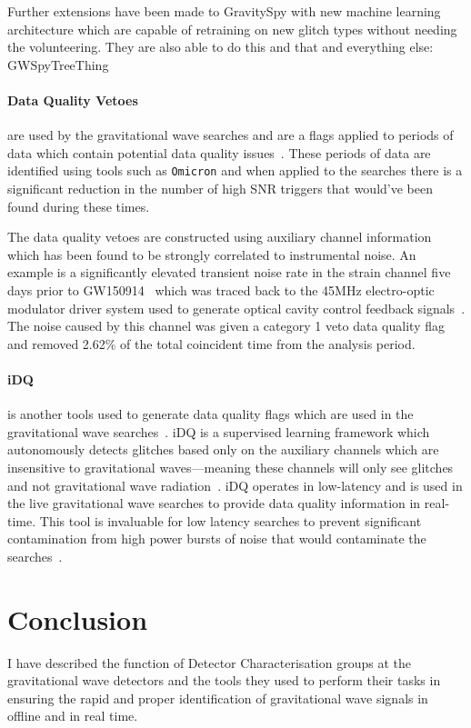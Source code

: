 Further extensions have been made to GravitySpy with new machine learning architecture which are capable of retraining on new glitch types without needing the volunteering. They are also able to do this and that and everything else: GWSpyTreeThing~\cite{}


\paragraph{Data Quality Vetoes}

are used by the gravitational wave searches and are a flags applied to periods of data which contain potential data quality issues~\cite{}. These periods of data are identified using tools such as \verb|Omicron| and when applied to the searches there is a significant reduction in the number of high SNR triggers that would've been found during these times.

The data quality vetoes are constructed using auxiliary channel information which has been found to be strongly correlated to instrumental noise. An example is a significantly elevated transient noise rate in the strain channel five days prior to GW150914~\cite{} which was traced back to the 45MHz electro-optic modulator driver system used to generate optical cavity control feedback signals~\cite{aligo}. The noise caused by this channel was given a category 1 veto data quality flag and removed 2.62\% of the total coincident time from the analysis period.

\paragraph{iDQ}

is another tools used to generate data quality flags which are used in the gravitational wave searches~\cite{}. iDQ is a supervised learning framework which autonomously detects glitches based only on the auxiliary channels which are insensitive to gravitational waves---meaning these channels will only see glitches and not gravitational wave radiation~\cite{}. iDQ operates in low-latency and is used in the live gravitational wave searches to provide data quality information in real-time. This tool is invaluable for low latency searches to prevent significant contamination from high power bursts of noise that would contaminate the searches~\cite{}.

\section{Conclusion}

I have described the function of Detector Characterisation groups at the gravitational wave detectors and the tools they used to perform their tasks in ensuring the rapid and proper identification of gravitational wave signals in offline and in real time. 
